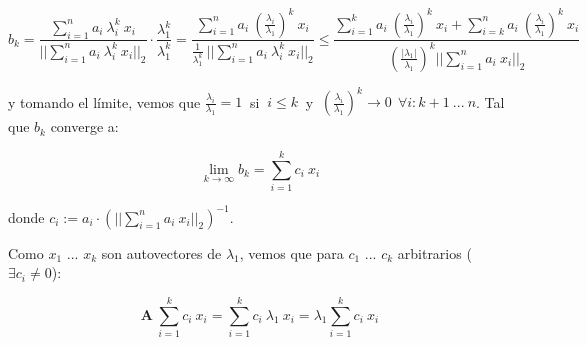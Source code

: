 \begin{equation} \label{eq_limite}
    b_k = \frac{\sum_{i=1}^{n} a_i \ \lambda_{i}^{k} \ x_i }{||\sum_{i=1}^{n} a_i \ \lambda_{i}^{k} \ x_i||_2} \cdot \frac{\lambda_1^k}{\lambda_1^k} 
        = \frac{\sum_{i=1}^{n} a_i \ (\frac{\lambda_{i}}{\lambda_{1}})^{k} \ x_i}{\frac{1}{\lambda_{1}^{k}}\ ||\sum_{i=1}^{n} a_i \ \lambda_{i}^{k} \ x_i||_2}
        \leq \frac{\sum_{i=1}^{k} a_i\ (\frac{\lambda_{i}}{\lambda_{1}})^{k}\ x_i + \sum_{i=k}^{n} a_i \ (\frac{\lambda_{i}}{\lambda_{1}})^{k} \ x_i }{(\frac{|\lambda_{1}|}{\lambda_{1}})^k ||\sum_{i=1}^{n} a_i \ x_i||_2}
\end{equation}

\vspace{1em}
\noindent y tomando el límite, vemos que $\frac{\lambda_{i}}{\lambda_{1}} = 1\ $ si $\ i \leq k\ $ y $\ (\frac{\lambda_{i}}{\lambda_{1}})^{k} \longrightarrow 0 \ \ \forall i: k + 1\ ...\ n$. Tal que $b_k$ converge a:

\begin{equation*}
    \lim_{k \to \infty} b_k = \sum_{i=1}^{k} c_i\ x_i  
\end{equation*}

\vspace{1em}
\noindent donde $c_i := a_i \cdot (||\sum_{i=1}^{n} a_i \ x_i||_2)^{-1}$. 


\newpage
\noindent Como $x_1$ ... $x_k$ son autovectores de $\lambda_1$, vemos que para $c_1$ ... $c_k$ arbitrarios ($\exists c_i \neq 0$):

\begin{equation*}
    \mathbf{A} \ \sum_{i=1}^{k} c_i\ x_i = \sum_{i=1}^{k} c_i\ \lambda_1\ x_i = \lambda_1 \sum_{i=1}^{k} c_i\ x_i
\end{equation*}

